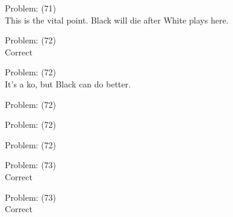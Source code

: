 \documentclass[11pt]{article}
\begin{document}
\begin{minipage}[t]{0.5\textwidth}
  {\centering
  
Problem: (71)\\
This is the vital point. Black will die after White plays here.\\
  }
\end{minipage}
\begin{minipage}[t]{0.5\textwidth}
  {\centering
  
Problem: (72)\\
Correct\\
  }
\end{minipage}
\begin{minipage}[t]{0.5\textwidth}
  {\centering
  
Problem: (72)\\
It's a ko, but Black can do better.\\
  }
\end{minipage}
\begin{minipage}[t]{0.5\textwidth}
  {\centering
  
Problem: (72)\\
  }
\end{minipage}
\begin{minipage}[t]{0.5\textwidth}
  {\centering
  
Problem: (72)\\
  }
\end{minipage}
\begin{minipage}[t]{0.5\textwidth}
  {\centering
  
Problem: (72)\\
  }
\end{minipage}
\begin{minipage}[t]{0.5\textwidth}
  {\centering
  
Problem: (73)\\
Correct\\
  }
\end{minipage}
\begin{minipage}[t]{0.5\textwidth}
  {\centering
  
Problem: (73)\\
Correct\\
  }
\end{minipage}
\end{document}
